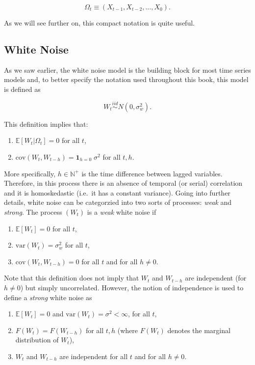 \documentclass[]{book}
\providecommand{\tightlist}{%
  \setlength{\itemsep}{0pt}\setlength{\parskip}{0pt}}
\theoremstyle{definition}
\theoremstyle{definition}
\theoremstyle{definition}
\theoremstyle{remark}
\begin{document}
\[\Omega_t \equiv \left(X_{t-1}, X_{t-2}, ..., X_0 \right).\]

As we will see further on, this compact notation is quite useful.

\subsection{White Noise}\label{wn}

As we saw earlier, the white noise model is the building block for most
time series models and, to better specify the notation used throughout
this book, this model is defined as

\[{W_t}\mathop \sim \limits^{iid} N\left( {0,\sigma _w^2} \right).\]

This definition implies that:

\begin{enumerate}
\def\labelenumi{\arabic{enumi}.}
\tightlist
\item
  \(\mathbb{E}[W_t | \Omega_t] = 0\) for all \(t\),
\item
  \(\text{cov}\left(W_t, W_{t-h} \right) = \boldsymbol{1}_{h = 0} \; \sigma^2\)
  for all \(t, h\).
\end{enumerate}

More specifically, \(h \in \mathbb{N}^+\) is the time difference between
lagged variables. Therefore, in this process there is an absence of
temporal (or serial) correlation and it is homoskedastic (i.e.~it has a
constant variance). Going into further details, white noise can be
categorzied into two sorts of processes: \emph{weak} and \emph{strong}.
The process \((W_t)\) is a \emph{weak} white noise if

\begin{enumerate}
\def\labelenumi{\arabic{enumi}.}
\tightlist
\item
  \(\mathbb{E}[W_t] = 0\) for all \(t\),
\item
  \(\text{var}\left(W_t\right) = \sigma_w^2\) for all \(t\),
\item
  \(\text{cov} \left(W_t, W_{t-h}\right) = 0\) for all \(t\) and for all
  \(h \neq 0\).
\end{enumerate}

Note that this definition does not imply that \(W_t\) and \(W_{t-h}\)
are independent (for \(h \neq 0\)) but simply uncorrelated. However, the
notion of independence is used to define a \emph{strong} white noise as

\begin{enumerate}
\def\labelenumi{\arabic{enumi}.}
\tightlist
\item
  \(\mathbb{E}[W_t] = 0\) and \(\text{var}(W_t) = \sigma^2 < \infty\),
  for all \(t\),
\item
  \(F(W_t) = F(W_{t-h})\) for all \(t,h\) (where \(F(W_t)\) denotes the
  marginal distribution of \(W_t\)),
\item
  \(W_t\) and \(W_{t-h}\) are independent for all \(t\) and for all
  \(h \neq 0\).
\end{enumerate}
\end{document}
